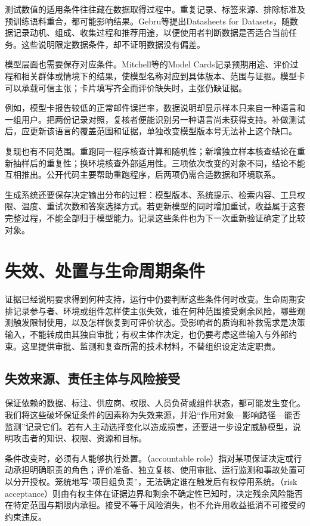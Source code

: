测试数值的适用条件往往藏在数据取得过程中。重复记录、标签来源、排除标准及预训练语料重合，都可能影响结果。Gebru等提出Datasheets for Datasets，随数据记录动机、组成、收集过程和推荐用途，以便使用者判断数据是否适合当前任务。这些说明限定数据条件，却不证明数据没有偏差。

模型层面也需要保存对应条件。Mitchell等的Model Cards记录预期用途、评价过程和相关群体或情境下的结果，使模型名称对应到具体版本、范围与证据。模型卡可以承载可信主张；卡片填写齐全而评价缺失时，主张仍缺证据。

例如，模型卡报告较低的正常邮件误拦率，数据说明却显示样本只来自一种语言和一组用户。把两份记录对照，复核者便能识别另一种语言尚未获得支持。补做测试后，应更新该语言的覆盖范围和证据，单独改变模型版本号无法补上这个缺口。

复现也有不同范围。重跑同一程序核查计算和随机性；新增独立样本核查结论在重新抽样后的重复性；换环境核查外部适用性。三项依次改变的对象不同，结论不能互相推出。公开代码主要帮助重跑程序，后两项仍需合适数据和环境联系。

生成系统还要保存决定输出分布的过程：模型版本、系统提示、检索内容、工具权限、温度、重试次数和答案选择方式。若更新模型的同时增加重试，收益属于这套完整过程，不能全部归于模型能力。记录这些条件也为下一次重新验证确定了比较对象。

\section{失效、处置与生命周期条件}
\label{sec:trust-lifecycle}

证据已经说明要求得到何种支持，运行中仍要判断这些条件何时改变。生命周期安排记录参与者、环境或组件怎样使主张失效，谁在何种范围接受剩余风险，哪些观测触发限制使用，以及怎样恢复到可评价状态。受影响者的质询和补救需求是决策输入，不能转成由其独自审批；有权主体作决定，也仍要考虑这些输入与外部约束。这里提供审批、监测和复查所需的技术材料，不替组织设定法定职责。

\subsection{失效来源、责任主体与风险接受}

保证依赖的数据、标注、供应商、权限、人员负荷或组件状态，都可能发生变化。我们将这些破坏保证条件的因素称为失效来源，并沿“作用对象—影响路径—能否监测”记录它们。若有人主动选择变化以造成损害，还要进一步设定威胁模型，说明攻击者的知识、权限、资源和目标。

条件改变时，必须有人能够执行处置。（accountable role）指对某项保证决定或行动承担明确职责的角色；评价准备、独立复核、使用审批、运行监测和事故处置可以分开授权。笼统地写“项目组负责”，无法确定谁在触发后有权停用系统。（risk acceptance）则由有权主体在证据边界和剩余不确定性已知时，决定残余风险能否在特定范围与期限内承担。接受不等于风险消失，也不允许用收益抵消不可接受的约束违反。

